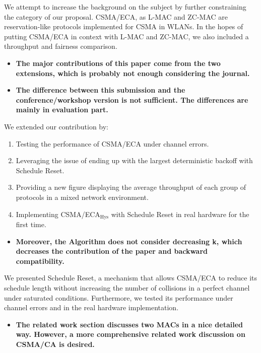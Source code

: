 \documentclass[]{article}
\begin{document}
		We attempt to increase the background on the subject by further constraining the category of our proposal. CSMA/ECA, as L-MAC and ZC-MAC are reservation-like protocols implemented for CSMA in WLANs. In the hopes of putting CSMA/ECA in context with L-MAC and ZC-MAC, we also included a throughput and fairness comparison.
		
		\begin{itemize}
			\item {\bfseries The major contributions of this paper come from the two extensions, which is probably not enough considering the journal.}
			\item {\bfseries The difference between this submission and the conference/workshop version is not sufficient. The differences are mainly in evaluation part.}
		\end{itemize}
		
		We extended our contribution by:
			\begin{enumerate}
				\item Testing the performance of CSMA/ECA under channel errors.
				\item Leveraging the issue of ending up with the largest deterministic backoff with Schedule Reset.
				\item Providing a new figure displaying the average throughput of each group of protocols in a mixed network environment.
				\item Implementing CSMA/ECA$_{\text{Hys}}$ with Schedule Reset in real hardware for the first time.
			\end{enumerate}
			
		\begin{itemize}
			\item {\bfseries Moreover, the Algorithm does not consider decreasing k, which decreases the contribution of the paper and backward compatibility.}
		\end{itemize}
		
		We presented Schedule Reset, a mechanism that allows CSMA/ECA to reduce its schedule length without increasing the number of collisions in a perfect channel under saturated conditions. Furthermore, we tested its performance under channel errors and in the real hardware implementation.
		
		\begin{itemize}
			\item {\bfseries The related work section discusses two MACs in a nice detailed way. However, a more comprehensive related work discussion on CSMA/CA is desired.}
		\end{itemize}
		
\end{document}
